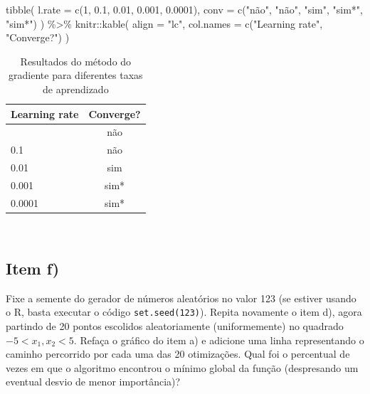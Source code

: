 \documentclass[
  a4paperpaper,
]{article}
\newenvironment{Shaded}{\begin{snugshade}}{\end{snugshade}}
\newcommand{\AttributeTok}[1]{\textcolor[rgb]{0.40,0.45,0.13}{#1}}
\newcommand{\FunctionTok}[1]{\textcolor[rgb]{0.28,0.35,0.67}{#1}}
\newcommand{\NormalTok}[1]{\textcolor[rgb]{0.00,0.23,0.31}{#1}}
\newcommand{\SpecialCharTok}[1]{\textcolor[rgb]{0.37,0.37,0.37}{#1}}
\newcommand{\StringTok}[1]{\textcolor[rgb]{0.13,0.47,0.30}{#1}}
\begin{document}
\begin{Shaded}
\begin{Highlighting}[]
\FunctionTok{tibble}\NormalTok{(}
  \AttributeTok{l.rate =} \FunctionTok{c}\NormalTok{(}\StringTok{\textquotesingle{}1\textquotesingle{}}\NormalTok{, }\StringTok{\textquotesingle{}0.1\textquotesingle{}}\NormalTok{, }\StringTok{\textquotesingle{}0.01\textquotesingle{}}\NormalTok{, }\StringTok{\textquotesingle{}0.001\textquotesingle{}}\NormalTok{, }\StringTok{\textquotesingle{}0.0001\textquotesingle{}}\NormalTok{),}
  \AttributeTok{conv =} \FunctionTok{c}\NormalTok{(}\StringTok{"não"}\NormalTok{, }\StringTok{"não"}\NormalTok{, }\StringTok{"sim"}\NormalTok{, }\StringTok{"sim*"}\NormalTok{, }\StringTok{"sim*"}\NormalTok{)}
\NormalTok{) }\SpecialCharTok{\%\textgreater{}\%}
\NormalTok{  knitr}\SpecialCharTok{::}\FunctionTok{kable}\NormalTok{(}
    \AttributeTok{align =} \StringTok{"lc"}\NormalTok{,}
    \AttributeTok{col.names =} \FunctionTok{c}\NormalTok{(}\StringTok{"Learning rate"}\NormalTok{, }\StringTok{"Converge?"}\NormalTok{)}
\NormalTok{  )}
\end{Highlighting}
\end{Shaded}

\begin{longtable}[]{@{}lc@{}}

\caption{\label{tbl-q1e}Resultados do método do gradiente para
diferentes taxas de aprendizado}

\tabularnewline

\toprule\noalign{}
Learning rate & Converge? \\
\midrule\noalign{}
\endhead
\bottomrule\noalign{}
\endlastfoot
1 & não \\
0.1 & não \\
0.01 & sim \\
0.001 & sim* \\
0.0001 & sim* \\

\end{longtable}

~

\subsection{Item f)}\label{item-f}

Fixe a semente do gerador de números aleatórios no valor 123 (se estiver
usando o R, basta executar o código \texttt{set.seed(123)}). Repita
novamente o item d), agora partindo de 20 pontos escolidos
aleatoriamente (uniformemente) no quadrado \(−5 < x_1 , x_2 < 5\).
Refaça o gráfico do item a) e adicione uma linha representando o caminho
percorrido por cada uma das 20 otimizações. Qual foi o percentual de
vezes em que o algoritmo encontrou o mínimo global da função
(despresando um eventual desvio de menor importância)?
\end{document}
